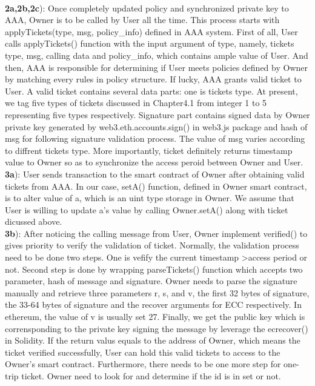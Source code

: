 \\\noindent \textbf{2a,2b,2c}): Once completely updated policy and synchronized private key to AAA, Owner is to be called by User all the time. This process starts with applyTickets(type, msg, policy\_info) defined in AAA system. First of all, User calls applyTickets() function with the input argument of type, namely, tickets type, msg, calling data and policy\_info, which contains ample value of User. And then, AAA is responsible for determining if User meets policies defined by Owner by matching every rules in policy structure. If lucky, AAA grants valid ticket to User. A valid ticket contains several data parts: one is tickets type. At present, we tag five types of tickets discussed in Chapter4.1 from integer 1 to 5 representing five types respectively. Signature part contains signed data by Owner private key generated by web3.eth.accounts.sign() in web3.js package and hash of msg for following signature validation process. The value of msg varies according to diffrent tickets type. More importantly, ticket definitely returns timestamp value to Owner so as to synchronize the access peroid between Owner and User.
\\\noindent \textbf{3a}): User sends transaction to the smart contract of Owner after obtaining valid tickets from AAA. In our case, setA() function, defined in Owner smart contract, is to alter value of a, which is an uint type storage in Owner. We assume that User is willing to update a's value by calling Owner.setA() along with ticket dicussed above.
\\\noindent \textbf{3b}): After noticing the calling message from User, Owner implement verified() to gives priority to verify the validation of ticket. Normally, the validation process need to be done two steps. One is vefify the current timestamp \textgreater  access period or not. Second step is done by wrapping parseTickets() function which accepts two parameter, hash of message and signature. Owner needs to parse the signature manually and retrieve three parameters r, s, and v, the first 32 bytes of signature, the 33-64 bytes of signature and the recover arguments for ECC respectively. In ethereum, the value of v is usually set 27. Finally, we get the public key which is corrensponding to the private key signing the message by leverage the ecrecover() in Solidity. If the return valus equals to the address of Owner, which means the ticket verified successfully, User can hold this valid tickets to access to the Owner's smart contract. Furthermore, there needs to be one more step for one-trip ticket. Owner need to look for and determine if the id is in set or not.



